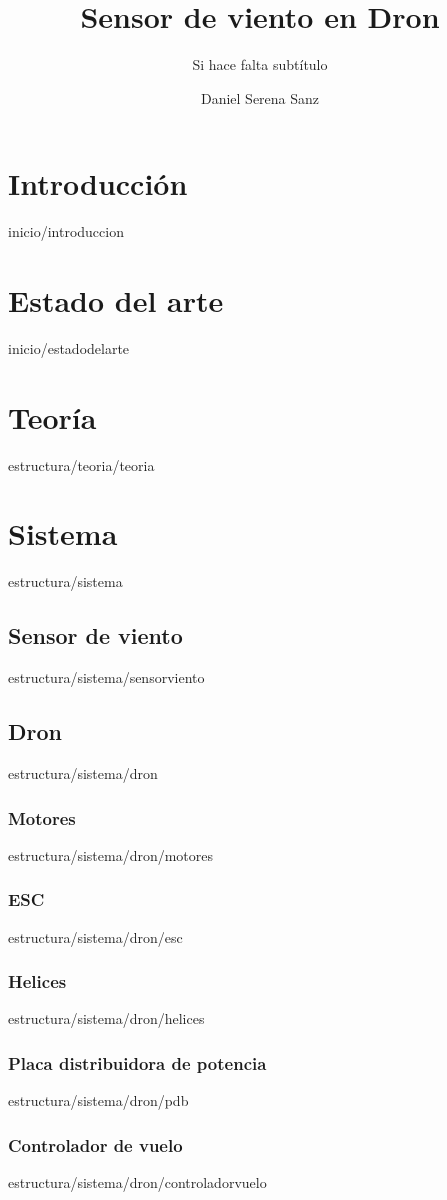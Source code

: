\documentclass[epsbased,copyright,final,printable,covers,extendedindex,firstnumbered,tfg,gnuplot]{tfgtfmthesisuam}
\title{Sensor de viento en Dron}
\subtitle{Si hace falta subtítulo}
\author{Daniel Serena Sanz}
\begin{document}
\chapter{Introducción\label{CAP:INTRODUCCION}}{inicio/introduccion}
\chapter{Estado del arte\label{CAP:ESTADODELARTE}}{inicio/estadodelarte}
\chapter{Teoría\label{CAP:INTRODUCCION}}{estructura/teoria/teoria}
\chapter{Sistema\label{CAP:SISTEMA}}{estructura/sistema}

	\section{Sensor de viento\label{SEC:SENSORVIENTO}}{estructura/sistema/sensorviento}

	\section{Dron\label{SEC:DRON}}{estructura/sistema/dron}
		\subsection{Motores\label{SS:MOTORES}}{estructura/sistema/dron/motores}
		\subsection{ESC\label{SS:ESC}}{estructura/sistema/dron/esc}
		\subsection{Helices\label{SS:HELICES}}{estructura/sistema/dron/helices}
		\subsection{Placa distribuidora de potencia\label{SS:PDB}}{estructura/sistema/dron/pdb}
		\subsection{Controlador de vuelo\label{SS:CONTROLADORVUELO}}{estructura/sistema/dron/controladorvuelo}
\end{document}
